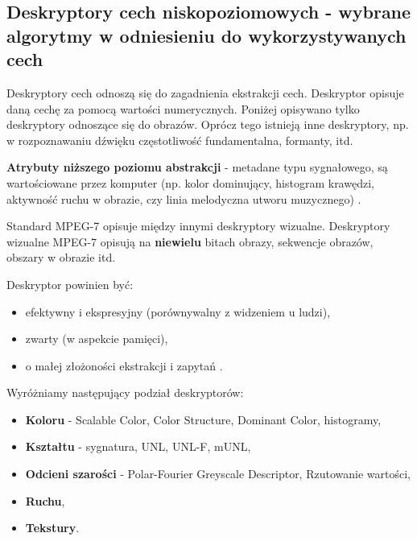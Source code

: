 \documentclass[wi]{zut}
\begin{document}


\subsection{Deskryptory cech niskopoziomowych - wybrane algorytmy w odniesieniu do wykorzystywanych cech}

Deskryptory cech odnoszą się do zagadnienia ekstrakcji cech. Deskryptor opisuje daną cechę za pomocą wartości numerycznych. Poniżej opisywano tylko deskryptory odnoszące się do obrazów. Oprócz tego istnieją inne deskryptory, np. w rozpoznawaniu dźwięku częstotliwość fundamentalna, formanty, itd.

\textbf{Atrybuty niższego poziomu abstrakcji} - metadane typu sygnałowego, są wartościowane przez komputer (np. kolor dominujący, histogram krawędzi, aktywność ruchu w obrazie, czy linia melodyczna utworu muzycznego) \cite{Frejlichowski2020}.

Standard MPEG-7 opisuje między innymi deskryptory wizualne. Deskryptory wizualne MPEG-7 opisują na \textbf{niewielu} bitach obrazy, sekwencje obrazów, obszary w obrazie itd. 

Deskryptor powinien być:

\begin{itemize}
    \item efektywny i ekspresyjny (porównywalny z widzeniem u ludzi),
    \item zwarty (w aspekcie pamięci),
    \item o małej złożoności ekstrakcji i zapytań \cite{Frejlichowski2020}.
\end{itemize}

Wyróżniamy następujący podział deskryptorów:

\begin{itemize}
    \item \textbf{Koloru} - Scalable Color, Color Structure, Dominant Color, histogramy,
    \item \textbf{Kształtu} - sygnatura, UNL, UNL-F, mUNL,
    \item \textbf{Odcieni szarości} - Polar-Fourier Greyscale Descriptor, Rzutowanie wartości,
    \item \textbf{Ruchu},
    \item \textbf{Tekstury}.
\end{itemize}
\end{document}

